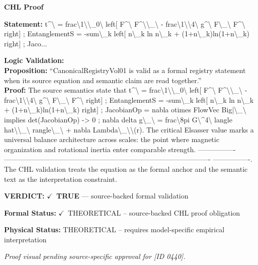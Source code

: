 \vspace{0.45em}
\noindent\textbf{CHL Proof}\par
\textbf{Statement:} t\textasciicircum{}\textbackslash{} = frac\textbackslash{}1\textbackslash{}\textbackslash{}\_0\textbackslash{} left[ F\textasciicircum{}\textbackslash{} F\textasciicircum{}\textbackslash{}\textbackslash{}\_\textbackslash{} - frac\textbackslash{}1\textbackslash{}\textbackslash{}4\textbackslash{} g\textasciicircum{}\textbackslash{} F\textbackslash{}\_\textbackslash{} F\textasciicircum{}\textbackslash{} right] ; EntanglementS =
-sum\textbackslash{}\_k left[ n\textbackslash{}\_k ln n\textbackslash{}\_k + (1+n\textbackslash{}\_k)ln(1+n\textbackslash{}\_k) right] ; Jaco...

\textbf{Logic Validation:}\\
\textbf{Proposition:} ``CanonicalRegistryVol01 is valid as a formal registry statement when its source equation
and semantic claim are read together.''\\
\textbf{Proof:} The source semantics state that t\textasciicircum{}\textbackslash{} = frac\textbackslash{}1\textbackslash{}\textbackslash{}\_0\textbackslash{} left[ F\textasciicircum{}\textbackslash{} F\textasciicircum{}\textbackslash{}\textbackslash{}\_\textbackslash{} - frac\textbackslash{}1\textbackslash{}\textbackslash{}4\textbackslash{} g\textasciicircum{}\textbackslash{} F\textbackslash{}\_\textbackslash{}
F\textasciicircum{}\textbackslash{} right] ; EntanglementS = -sum\textbackslash{}\_k left[ n\textbackslash{}\_k ln n\textbackslash{}\_k + (1+n\textbackslash{}\_k)ln(1+n\textbackslash{}\_k) right] ;
JacobianOp = nabla otimes FlowVec Big|\textbackslash{}\_\textbackslash{} implies det(JacobianOp) -> 0 ; nabla delta
g\textbackslash{}\_\textbackslash{} = frac\textbackslash{}8pi G\textbackslash{}\textasciicircum{}4\textbackslash{} langle hat\textbackslash{}\textbackslash{}\_\textbackslash{} rangle\textbackslash{}\_\textbackslash{} + nabla Lambda\textbackslash{}\_\textbackslash{}\textbackslash{}(r). The critical
Elsasser value marks a universal balance architecture across scales: the point where
magnetic organization and rotational inertia enter comparable strength. ----------------
----------------------------------------------------------------------------------------
----------------. The CHL validation treats the equation as the formal anchor and the
semantic text as the interpretation constraint.

\textbf{VERDICT:} \ensuremath{\checkmark}\ \textbf{TRUE} --- source-backed formal validation

\textbf{Formal Status:} \ensuremath{\checkmark}\ THEORETICAL -- source-backed CHL proof obligation

\textbf{Physical Status:} THEORETICAL -- requires model-specific empirical interpretation
\par\vspace{0.45em}
\par
\vfill
\begingroup\footnotesize\itshape
Proof visual pending source-specific approval for [ID 0440].
\par\endgroup
\vfill
\endgroup
\endgroup
